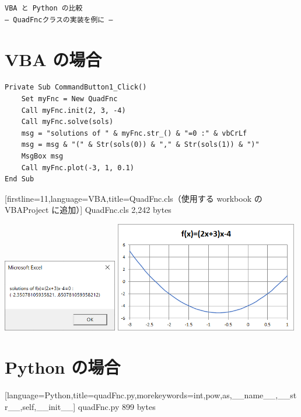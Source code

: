 \documentclass{jsarticle}
\begin{document}
\begin{center}
 \texttt{\LARGE VBA と Python の比較\\
	― QuadFncクラスの実装を例に ―}
\end{center}

\smallskip

\section*{VBA の場合}

\begin{lstlisting}[language=VBA,title=CommandButton1をクリックした時のプロシージャ]
Private Sub CommandButton1_Click()
    Set myFnc = New QuadFnc
    Call myFnc.init(2, 3, -4)
    Call myFnc.solve(sols)
    msg = "solutions of " & myFnc.str_() & "=0 :" & vbCrLf
    msg = msg & "(" & Str(sols(0)) & "," & Str(sols(1)) & ")"
    MsgBox msg
    Call myFnc.plot(-3, 1, 0.1)
End Sub
\end{lstlisting}


	[firstline=11,language=VBA,title=QuadFnc.cls（使用する workbook の VBAProject に追加）]
	{QuadFnc.cls}
\hfill 2,242 bytes

\includegraphics[width=5cm]{img/msgBox.png}\quad
\includegraphics[width=8cm]{img/fig_xls.png}

\section*{Python の場合}


	[language=Python,title=quadFnc.py,morekeywords={int,pow,as,__name__,__str__,self,__init__}]
	{quadFnc.py}
\hfill 899 bytes
\end{document}
